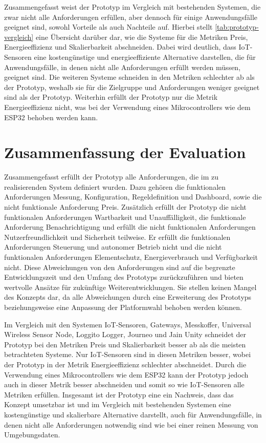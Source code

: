 Zusammengefasst weist der Prototyp im Vergleich mit bestehenden Systemen, die zwar nicht alle Anforderungen erfüllen, aber dennoch für einige Anwendungsfälle geeignet sind, sowohl Vorteile als auch Nachteile auf.
Hierbei stellt \cref{tab:prototyp-vergleich} eine Übersicht darüber dar, wie die Systeme für die Metriken Preis, Energieeffizienz und Skalierbarkeit abschneiden.
Dabei wird deutlich, dass IoT-Sensoren eine kostengünstige und energieeffiziente Alternative darstellen, die für Anwendungsfälle, in denen nicht alle Anforderungen erfüllt werden müssen, geeignet sind.
Die weiteren Systeme schneiden in den Metriken schlechter ab als der Prototyp, weshalb sie für die Zielgruppe und Anforderungen weniger geeignet sind als der Prototyp.
Weiterhin erfüllt der Prototyp nur die Metrik Energieeffizienz nicht, was bei der Verwendung eines Mikrocontrollers wie dem ESP32 behoben werden kann.



\section{Zusammenfassung der Evaluation}
Zusammengefasst erfüllt der Prototyp alle Anforderungen, die im zu realisierenden System definiert wurden.
Dazu gehören die funktionalen Anforderungen Messung, Konfiguration, Regeldefinition und Dashboard, sowie die nicht funktionale Anforderung Preis.
Zusätzlich erfüllt der Prototyp die nicht funktionalen Anforderungen Wartbarkeit und Unauffälligkeit, die funktionale Anforderung Benachrichtigung und erfüllt die nicht funktionalen Anforderungen Nutzerfreundlichkeit und Sicherheit teilweise.
Er erfüllt die funktionalen Anforderungen Steuerung und autonomer Betrieb nicht und die nicht funktionalen Anforderungen Elementschutz, Energieverbrauch und Verfügbarkeit nicht.
Diese Abweichungen von den Anforderungen sind auf die begrenzte Entwicklungszeit und den Umfang des Prototyps zurückzuführen und bieten wertvolle Ansätze für zukünftige Weiterentwicklungen.
Sie stellen keinen Mangel des Konzepts dar, da alle Abweichungen durch eine Erweiterung des Prototyps beziehungsweise eine Anpassung der Platformwahl behoben werden können.

Im Vergleich mit den Systemen IoT-Sensoren, Gateways, Messkoffer, Universal Wireless Sensor Node, Loggito Logger, Journeo und Jain Unity schneidet der Prototyp bei den Metriken Preis und Skalierbarkeit besser ab als die meisten betrachteten Systeme.
Nur IoT-Sensoren sind in diesen Metriken besser, wobei der Prototyp in der Metrik Energieeffizienz schlechter abschneidet.
Durch die Verwendung eines Mikrocontrollers wie dem ESP32 kann der Prototyp jedoch auch in dieser Metrik besser abschneiden und somit so wie IoT-Sensoren alle Metriken erfüllen.
Insgesamt ist der Prototyp eine ein Nachweis, dass das Konzept umsetzbar ist und im Vergleich mit bestehenden Systemen eine kostengünstige und skalierbare Alternative darstellt, auch für Anwendungsfälle, in denen nicht alle Anforderungen notwendig sind wie bei einer reinen Messung von Umgebungsdaten.